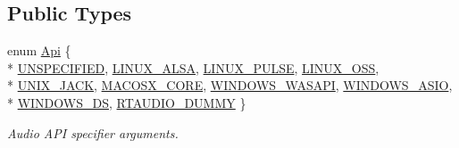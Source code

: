 \subsection*{Public Types}
\begin{DoxyCompactItemize}
\item 
enum \hyperlink{class_rt_audio_ac9b6f625da88249d08a8409a9db0d849}{Api} \{ \\*
\hyperlink{class_rt_audio_ac9b6f625da88249d08a8409a9db0d849aa49af3ac767106158bc6cad74fb214ae}{U\+N\+S\+P\+E\+C\+I\+F\+I\+ED}, 
\hyperlink{class_rt_audio_ac9b6f625da88249d08a8409a9db0d849aa7a2ba095c2806caa893b6fb8fc3a1a8}{L\+I\+N\+U\+X\+\_\+\+A\+L\+SA}, 
\hyperlink{class_rt_audio_ac9b6f625da88249d08a8409a9db0d849adc17dff310e85d303fb326c837c08d77}{L\+I\+N\+U\+X\+\_\+\+P\+U\+L\+SE}, 
\hyperlink{class_rt_audio_ac9b6f625da88249d08a8409a9db0d849a39c84615e61de75e6a4e865596d62c82}{L\+I\+N\+U\+X\+\_\+\+O\+SS}, 
\\*
\hyperlink{class_rt_audio_ac9b6f625da88249d08a8409a9db0d849a4767e17c6edfbd827f91763915df4105}{U\+N\+I\+X\+\_\+\+J\+A\+CK}, 
\hyperlink{class_rt_audio_ac9b6f625da88249d08a8409a9db0d849a9fec92b8272244a87a6a11a717bd662d}{M\+A\+C\+O\+S\+X\+\_\+\+C\+O\+RE}, 
\hyperlink{class_rt_audio_ac9b6f625da88249d08a8409a9db0d849ab8c95b5490f3666ad272dfead9b9ae38}{W\+I\+N\+D\+O\+W\+S\+\_\+\+W\+A\+S\+A\+PI}, 
\hyperlink{class_rt_audio_ac9b6f625da88249d08a8409a9db0d849a219517d1df90f94d07758481155bd469}{W\+I\+N\+D\+O\+W\+S\+\_\+\+A\+S\+IO}, 
\\*
\hyperlink{class_rt_audio_ac9b6f625da88249d08a8409a9db0d849a28478830f42c2fd61e6c7ad498901931}{W\+I\+N\+D\+O\+W\+S\+\_\+\+DS}, 
\hyperlink{class_rt_audio_ac9b6f625da88249d08a8409a9db0d849ab06b8fd88bf18c9a2b8271f6961ae2d1}{R\+T\+A\+U\+D\+I\+O\+\_\+\+D\+U\+M\+MY}
 \}\begin{DoxyCompactList}\small\item\em Audio A\+PI specifier arguments. \end{DoxyCompactList}
\end{DoxyCompactItemize}
